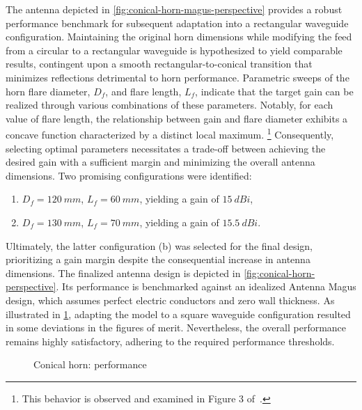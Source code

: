 \documentclass[14pt,a4paper]{ntust_report}
\begin{document}
The antenna depicted in \cref{fig:conical-horn-magus-perspective} provides a robust performance benchmark for subsequent adaptation into a rectangular waveguide configuration. Maintaining the original horn dimensions while modifying the feed from a circular to a rectangular waveguide is hypothesized to yield comparable results, contingent upon a smooth rectangular-to-conical transition that minimizes reflections detrimental to horn performance. Parametric sweeps of the horn flare diameter, $D_f$, and flare length, $L_f$, indicate that the target gain can be realized through various combinations of these parameters. Notably, for each value of flare length, the relationship between gain and flare diameter exhibits a concave function characterized by a distinct local maximum.%
    \footnote{This behavior is observed and examined in Figure 3 of~\parencite{aboserwal-et-al:conical-horn-gain-and-amplitude-patterns}.}
Consequently, selecting optimal parameters necessitates a trade-off between achieving the desired gain with a sufficient margin and minimizing the overall antenna dimensions. Two promising configurations were identified:
\begin{enumerate}[label=(\alph*)]
    \item $D_f = \qty{120}{mm}$, $L_f = \qty{60}{mm}$, yielding a gain of $\qty{15}{dBi}$,
    \item $D_f = \qty{130}{mm}$, $L_f = \qty{70}{mm}$, yielding a gain of $\qty{15.5}{dBi}$.
\end{enumerate}
Ultimately, the latter configuration (b) was selected for the final design, prioritizing a gain margin despite the consequential increase in antenna dimensions. The finalized antenna design is depicted in \cref{fig:conical-horn-perspective}. Its performance is benchmarked against an idealized Antenna Magus design, which assumes perfect electric conductors and zero wall thickness. As illustrated in \cref{fig:conical-horn-performance-comparison}, adapting the model to a square waveguide configuration resulted in some deviations in the figures of merit. Nevertheless, the overall performance remains highly satisfactory, adhering to the required performance thresholds.

\begin{figure}[!ht]
    \centering
    
    \caption{\label{fig:conical-horn-performance-comparison}Conical horn: performance}
\end{figure}
\end{document}
